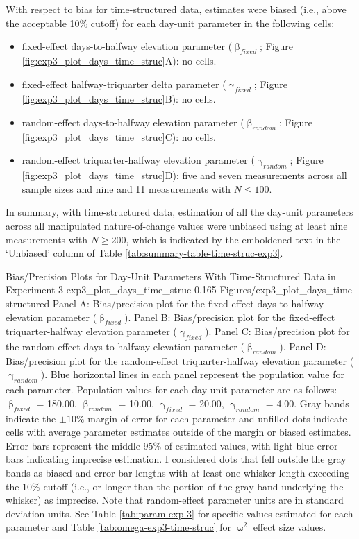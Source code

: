 \documentclass[
12pt, %
twoside,
english]{guelphthesis}
\begin{document}
With respect to bias for time-structured data, estimates were biased (i.e., above the acceptable 10\% cutoff) for each day-unit parameter in the following cells:
\begin{itemize}
\tightlist
\item
  fixed-effect days-to-halfway elevation parameter (\(\upbeta_{fixed}\); Figure \ref{fig:exp3_plot_days_time_struc}A): no cells.
\item
  fixed-effect halfway-triquarter delta parameter (\(\upgamma_{fixed}\); Figure \ref{fig:exp3_plot_days_time_struc}B): no cells.
\item
  random-effect days-to-halfway elevation parameter (\(\upbeta_{random}\); Figure \ref{fig:exp3_plot_days_time_struc}C): no cells.
\item
  random-effect triquarter-halfway elevation parameter (\(\upgamma_{random}\); Figure \ref{fig:exp3_plot_days_time_struc}D): five and seven measurements across all sample sizes and nine and 11 measurements with \(N \le 100\).
\end{itemize}
In summary, with time-structured data, estimation of all the day-unit parameters across all manipulated nature-of-change values were unbiased using at least nine measurements with \(N \ge 200\), which is indicated by the emboldened text in the `Unbiased' column of Table \ref{tab:summary-table-time-struc-exp3}.
\begin{apaFigure}
[portrait]
[samepage]
[-0.2cm]
{Bias/Precision Plots for Day-Unit Parameters With Time-Structured Data in Experiment 3}
{exp3_plot_days_time_struc}
{0.165}
{Figures/exp3_plot_days_time structured}
{Panel A: Bias/precision plot for the fixed-effect days-to-halfway elevation parameter ($\upbeta_{fixed}$). Panel B: Bias/precision plot for the fixed-effect triquarter-halfway elevation parameter ($\upgamma_{fixed}$). Panel C: Bias/precision plot for the random-effect days-to-halfway elevation parameter ($\upbeta_{random}$). Panel D: Bias/precision plot for the random-effect triquarter-halfway elevation parameter ($\upgamma_{random}$). Blue horizontal lines in each panel represent the population value for each parameter. Population values for each day-unit parameter are as follows: $\upbeta_{fixed}$ = 180.00, $\upbeta_{random}$ = 10.00, $\upgamma_{fixed}$ = 20.00, $\upgamma_{random}$ = 4.00. Gray bands indicate the $\pm 10\%$ margin of error for each parameter and unfilled dots indicate cells with average parameter estimates outside of the margin or biased estimates. Error bars represent the middle 95\% of estimated values, with light blue error bars indicating imprecise estimation. I considered dots that fell outside the gray bands as biased and error bar lengths with at least one whisker length exceeding the 10\% cutoff (i.e., or longer than the portion of the gray band underlying the whisker) as imprecise. Note that random-effect parameter units are in standard deviation units. See Table \ref{tab:param-exp-3} for specific values estimated for each parameter and Table \ref{tab:omega-exp3-time-struc} for $\upomega^2$ effect size values.}
\end{apaFigure}
\end{document}

